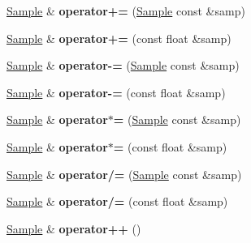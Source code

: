 \begin{DoxyCompactItemize}
\item 
\hypertarget{class_sample_aa844f1e48912fcc5a066320113105dfe}{\hyperlink{class_sample}{Sample} \& {\bfseries operator+=} (\hyperlink{class_sample}{Sample} const \&samp)}\label{class_sample_aa844f1e48912fcc5a066320113105dfe}

\item 
\hypertarget{class_sample_ace019d3d51a48162e56b24ae5a85a1a8}{\hyperlink{class_sample}{Sample} \& {\bfseries operator+=} (const float \&samp)}\label{class_sample_ace019d3d51a48162e56b24ae5a85a1a8}

\item 
\hypertarget{class_sample_a619539112f020c020bdb68542fa3868e}{\hyperlink{class_sample}{Sample} \& {\bfseries operator-\/=} (\hyperlink{class_sample}{Sample} const \&samp)}\label{class_sample_a619539112f020c020bdb68542fa3868e}

\item 
\hypertarget{class_sample_a00e2c3bd8103abfe4707948afa8aca0e}{\hyperlink{class_sample}{Sample} \& {\bfseries operator-\/=} (const float \&samp)}\label{class_sample_a00e2c3bd8103abfe4707948afa8aca0e}

\item 
\hypertarget{class_sample_ad67eca8f3ef3e9b3c9a3a4b0aeab249a}{\hyperlink{class_sample}{Sample} \& {\bfseries operator$\ast$=} (\hyperlink{class_sample}{Sample} const \&samp)}\label{class_sample_ad67eca8f3ef3e9b3c9a3a4b0aeab249a}

\item 
\hypertarget{class_sample_a2801e7ac8ac25acea1bf56a278c34b4f}{\hyperlink{class_sample}{Sample} \& {\bfseries operator$\ast$=} (const float \&samp)}\label{class_sample_a2801e7ac8ac25acea1bf56a278c34b4f}

\item 
\hypertarget{class_sample_a0dd24861acd07d226224febc25400961}{\hyperlink{class_sample}{Sample} \& {\bfseries operator/=} (\hyperlink{class_sample}{Sample} const \&samp)}\label{class_sample_a0dd24861acd07d226224febc25400961}

\item 
\hypertarget{class_sample_a22b3ac4d32507ad9d197c55fa49ad39d}{\hyperlink{class_sample}{Sample} \& {\bfseries operator/=} (const float \&samp)}\label{class_sample_a22b3ac4d32507ad9d197c55fa49ad39d}

\item 
\hypertarget{class_sample_aec7bcafe088f5bcc706457a72e9a8116}{\hyperlink{class_sample}{Sample} \& {\bfseries operator++} ()}\label{class_sample_aec7bcafe088f5bcc706457a72e9a8116}


\end{DoxyCompactItemize}
